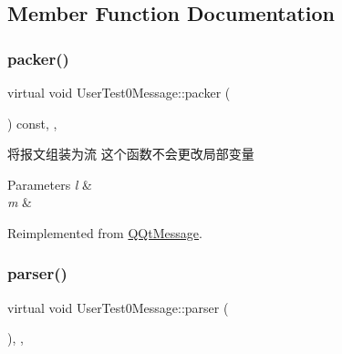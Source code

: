 \subsection{Member Function Documentation}
\mbox{\label{class_user_test0_message_a0f9138c6d8f36a78e6b6606ef5312469}} 
\subsubsection{\texorpdfstring{packer()}{packer()}}
{\footnotesize\ttfamily virtual void User\+Test0\+Message\+::packer (\begin{DoxyParamCaption}\item[{Q\+Byte\+Array \&}]{ }\end{DoxyParamCaption}) const\hspace{0.3cm}{\ttfamily [inline]}, {\ttfamily [override]}, {\ttfamily [virtual]}}



将报文组装为流 这个函数不会更改局部变量 


\begin{DoxyParams}{Parameters}
{\em l} & \\
\hline
{\em m} & \\
\hline
\end{DoxyParams}


Reimplemented from \mbox{\hyperlink{class_q_qt_message_af1885c2c3628495808dca66ee8d72e14}{Q\+Qt\+Message}}.

\mbox{\label{class_user_test0_message_a9f00ff24d2ecec2d4b8a2cf2800921e1}} 
\subsubsection{\texorpdfstring{parser()}{parser()}}
{\footnotesize\ttfamily virtual void User\+Test0\+Message\+::parser (\begin{DoxyParamCaption}\item[{const Q\+Byte\+Array \&}]{ }\end{DoxyParamCaption})\hspace{0.3cm}{\ttfamily [inline]}, {\ttfamily [override]}, {\ttfamily [virtual]}}



